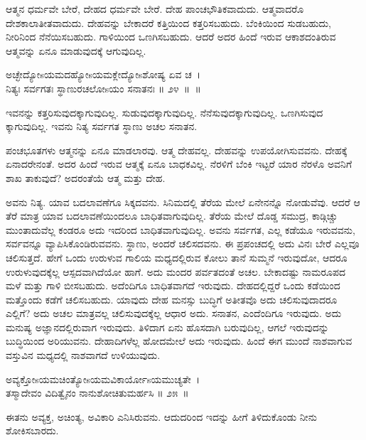 ಆತ್ಮನ ಧರ್ಮವೇ ಬೇರೆ, ದೇಹದ ಧರ್ಮವೇ ಬೇರೆ. ದೇಹ ಪಾಂಚಭೌತಿಕವಾದುದು. ಆತ್ಮವಾದರೊ ದೇಶಕಾಲಾತೀತವಾದುದು. ದೇಹವನ್ನು ಬೇಕಾದರೆ ಕತ್ತಿಯಿಂದ ಕತ್ತರಿಸಬಹುದು. ಬೆಂಕಿಯಿಂದ ಸುಡಬಹುದು, ನೀರಿನಿಂದ ನೆನೆಯಿಸಬಹುದು. ಗಾಳಿಯಿಂದ ಒಣಗಿಸಬಹುದು. ಆದರೆ ಅದರ ಹಿಂದೆ ಇರುವ ಆಕಾಶದಂತಿರುವ ಆತ್ಮವನ್ನು ಏನೂ ಮಾಡುವುದಕ್ಕೆ ಆಗುವುದಿಲ್ಲ.

\begin{shloka}
ಅಚ್ಛೇದ್ಯೋsಯಮದಹ್ಯೋsಯಮಕ್ಲೇದ್ಯೋsಶೋಷ್ಯ ಏವ ಚ~।\\ನಿತ್ಯಃ ಸರ್ವಗತಃ ಸ್ಥಾಣುರಚಲೋsಯಂ ಸನಾತನಃ \hfill॥ ೨೪~॥~॥
\end{shloka}

\begin{artha}
ಇವನನ್ನು ಕತ್ತರಿಸುವುದಕ್ಕಾಗುವುದಿಲ್ಲ. ಸುಡುವುದಕ್ಕಾಗುವುದಿಲ್ಲ. ನೆನೆಸುವುದಕ್ಕಾಗುವುದಿಲ್ಲ. ಒಣಗಿಸುವುದ ಕ್ಕಾಗುವುದಿಲ್ಲ. ಇವನು ನಿತ್ಯ ಸರ್ವಗತ ಸ್ಥಾಣು ಅಚಲ ಸನಾತನ.
\end{artha}

ಪಂಚಭೂತಗಳು ಆತ್ಮನನ್ನು ಏನೂ ಮಾಡಲಾರವು. ಆತ್ಮ ದೇಹವಲ್ಲ. ದೇಹವನ್ನು ಉಪಯೋಗಿಸುವವನು. ದೇಹಕ್ಕೆ ಏನಾದರೇನಂತೆ. ಅದರ ಹಿಂದೆ ಇರುವ ಆತ್ಮಕ್ಕೆ ಏನೂ ಬಾಧಕವಿಲ್ಲ. ನೆರಳಿಗೆ ಬೆಂಕಿ ಇಟ್ಟರೆ ಯಾರ ನೆರಳೊ ಅವನಿಗೆ ಶಾಖ ತಾಕುವುದೆ? ಅದರಂತೆಯೆ ಆತ್ಮ ಮತ್ತು ದೇಹ.

ಅವನು ನಿತ್ಯ. ಯಾವ ಬದಲಾವಣೆಗೂ ಸಿಕ್ಕದವನು. ಸಿನಿಮದಲ್ಲಿ ತೆರೆಯ ಮೇಲೆ ಏನೇನನ್ನೊ ನೋಡುವೆವು. ಆದರೆ ಆ ತೆರೆ ಮಾತ್ರ ಯಾವ ಬದಲಾವಣೆಯಿಂದಲೂ ಬಾಧಿತವಾಗುವುದಿಲ್ಲ. ತೆರೆಯ ಮೇಲೆ ದೊಡ್ಡ ಸಮುದ್ರ, ಕಾಡ್ಗಿಚ್ಚು ಮುಂತಾದುವೆಲ್ಲ ಕಂಡರೂ ಅದು ಇದರಿಂದ ಬಾಧಿತವಾಗುವುದಿಲ್ಲ. ಅವನು ಸರ್ವಗತ, ಎಲ್ಲ ಕಡೆಯೂ ಇರುವವನು, ಸರ್ವವನ್ನೂ ವ್ಯಾಪಿಸಿಕೊಂಡಿರುವವನು. ಸ್ಥಾಣು, ಅಂದರೆ ಚಲಿಸದವನು. ಈ ಪ್ರಪಂಚದಲ್ಲಿ ಅದು ವಿನಃ ಬೇರೆ ಎಲ್ಲವೂ ಚಲಿಸುತ್ತದೆ. ಹೇಗೆ ಒಂದು ಉರುಳುವ ಗಾಲಿಯ ಮಧ್ಯದಲ್ಲಿರುವ ಕೋಲು ತಾನೆ ಸುಮ್ಮನೆ ಇರುವುದೋ, ಆದರೂ ಉರುಳುವುದಕ್ಕೆಲ್ಲ ಆಸ್ಪದವಾಗಿದೆಯೋ ಹಾಗೆ. ಅದು ಮಂದರ ಪರ್ವತದಂತೆ ಅಚಲ. ಬೇಕಾದಷ್ಟು ನಾಮರೂಪದ ಮಳೆ ಮತ್ತು ಗಾಳಿ ಬೀಸಬಹುದು. ಅದೆಂದಿಗೂ ಬಾಧಿತವಾಗದೆ ಇರುವುದು. ದೇಹದಲ್ಲಿದ್ದರೆ ಒಂದು ಕಡೆಯಿಂದ ಮತ್ತೊಂದು ಕಡೆಗೆ ಚಲಿಸಬಹುದು. ಯಾವುದು ದೇಹ ಮನಸ್ಸು ಬುದ್ಧಿಗೆ ಅತೀತವೊ ಅದು ಚಲಿಸುವುದಾದರೂ ಎಲ್ಲಿಗೆ? ಅದು ಅಚಲ ಮಾತ್ರವಲ್ಲ ಚಲಿಸುವುದಕ್ಕೆಲ್ಲ ಆಧಾರ ಅದು. ಸನಾತನ, ಎಂದೆಂದಿಗೂ ಇರುವುದು. ಅದು ಮನುಷ್ಯ ಅಜ್ಞಾನದಲ್ಲಿರುವಾಗ ಇರುವುದು. ತಿಳಿದಾಗ ಏನು ಹೊಸದಾಗಿ ಬರುವುದಿಲ್ಲ, ಆಗಲೆ ಇರುವುದನ್ನು ಬುದ್ಧಿಯಿಂದ ಅರಿಯುವನು. ದೇಹಾದಿಗಳೆಲ್ಲ ಹೋದಮೇಲೆ ಅದು ಇರುವುದು. ಹಿಂದೆ ಈಗ ಮುಂದೆ ನಾಶವಾಗುವ ವಸ್ತುವಿನ ಮಧ್ಯದಲ್ಲಿ ನಾಶವಾಗದೆ ಉಳಿಯುವುದು.

\begin{shloka}
ಅವ್ಯಕ್ತೋsಯಮಚಿಂತ್ಯೋsಯಮವಿಕಾರ್ಯೋsಯಮುಚ್ಯತೇ~।\\ತಸ್ಮಾದೇವಂ ವಿದಿತ್ವೈನಂ ನಾನುಶೋಚಿತುಮರ್ಹಸಿ \hfill॥ ೨೫~॥
\end{shloka}

\begin{artha}
ಈತನು ಅವ್ಯಕ್ತ, ಅಚಿಂತ್ಯ, ಅವಿಕಾರಿ ಎನಿಸಿರುವನು. ಆದುದರಿಂದ ಇದನ್ನು ಹೀಗೆ ತಿಳಿದುಕೊಂಡು ನೀನು ಶೋಕಿಸಬಾರದು.
\end{artha}

